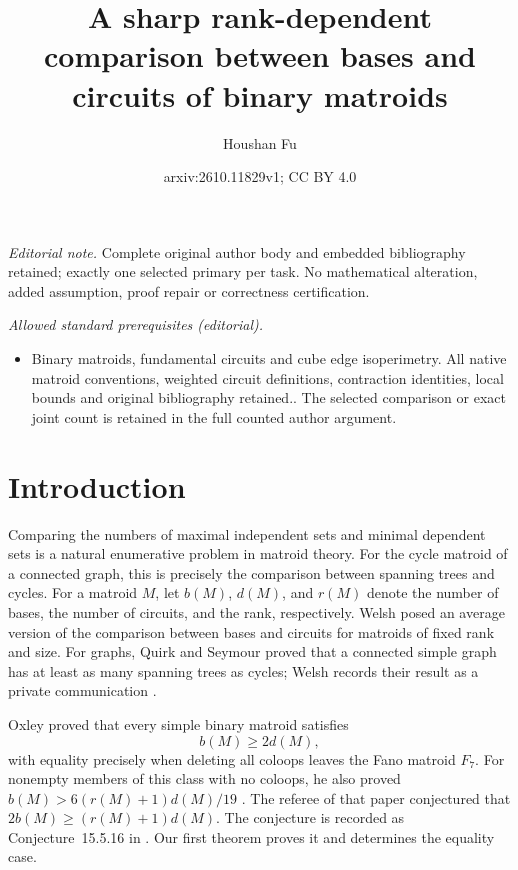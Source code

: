 \documentclass[10pt,a4paper]{article}
\title{A sharp rank-dependent comparison between bases and circuits of binary matroids}
\author{Houshan Fu}
\date{arxiv:2610.11829v1; CC BY 4.0}
\numberwithin{equation}{section}
\begin{document}
\maketitle
\noindent\textit{Editorial note.} Complete original author body and embedded bibliography retained; exactly one selected primary per task. No mathematical alteration, added assumption, proof repair or correctness certification.\par\medskip
\noindent\textit{Allowed standard prerequisites (editorial).}\begin{itemize}
\item Binary matroids, fundamental circuits and cube edge isoperimetry. All native matroid conventions, weighted circuit definitions, contraction identities, local bounds and original bibliography retained.. The selected comparison or exact joint count is retained in the full counted author argument.
\end{itemize}\medskip
\section{Introduction}

Comparing the numbers of maximal independent sets and minimal dependent
sets is a natural enumerative problem in matroid theory. For the cycle
matroid of a connected graph, this is precisely the comparison between
spanning trees and cycles.
For a matroid \(M\), let \(b(M)\), \(d(M)\), and \(r(M)\) denote
the number of bases, the number of circuits, and the rank, respectively.
Welsh \cite[p.~288, Exercise~5]{Welsh1976} posed an average version
of the comparison between bases and circuits for matroids of fixed
rank and size. For graphs, Quirk and Seymour proved that a connected
simple graph has at least as many spanning trees as cycles; Welsh
records their result as a private communication \cite[p.~287]{Welsh1976}.

Oxley \cite[Theorem~2.1]{Oxley1983} proved that every simple binary
matroid satisfies
\begin{equation}\label{eq:oxley}
 b(M)\ge2d(M),
\end{equation}
with equality precisely when deleting all coloops leaves the Fano
matroid \(F_7\). For nonempty members of this class with no coloops,
he also proved \(b(M)>6(r(M)+1)d(M)/19\)
\cite[Theorem~3.1]{Oxley1983}. The referee of that paper conjectured
that \(2b(M)\ge(r(M)+1)d(M)\).
The conjecture is recorded as Conjecture~15.5.16 in \cite{Oxley2011}.
Our first theorem proves it and determines the equality case.
\end{document}
